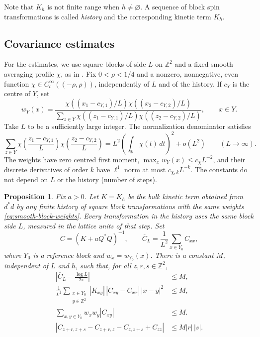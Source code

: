\documentclass[11pt]{article}
\numberwithin{equation}{section}
\newtheorem{proposition}[theorem]{Proposition}
\theoremstyle{definition}
\theoremstyle{plain}
\begin{document}
Note that $K_h$ is not finite range when $h \neq \varnothing$.
A sequence of block spin transformations is called \emph{history}
and the corresponding kinetic term $K_h$.


\subsection{Covariance estimates}
\label{subsec:free-covariance-estimates}

For the estimates, we use square blocks of side $L$ on
$\mathbb Z^2$ and a fixed smooth averaging profile $\chi$, as in
\cite[Sections~3.1 and~4.1]{OpenAI-O3}.
Fix $0<\rho<1/4$ and a nonzero, nonnegative, even function
$\chi\in C_c^\infty((-\rho,\rho))$, independently of $L$ and
of the history.  If $c_Y$ is the centre of $Y$, set
\begin{equation}
 w_Y(x)=
 \frac{\chi((x_1-c_{Y,1})/L)\chi((x_2-c_{Y,2})/L)}
 {\displaystyle\sum_{z\in Y}
   \chi((z_1-c_{Y,1})/L)\chi((z_2-c_{Y,2})/L)},
 \qquad x\in Y.
 \label{eq:smooth-block-weights}
\end{equation}
Take $L$ to be a sufficiently large integer. The normalization denominator satisfies
\begin{equation}
 \sum_{z\in Y}
 \chi\!\left(\frac{z_1-c_{Y,1}}L\right)
 \chi\!\left(\frac{z_2-c_{Y,2}}L\right)
 =L^2\left(\int_{\mathbb R}\chi(t)\,dt\right)^2+o(L^2)
 \qquad (L\to\infty).
 \label{eq:block-weight-normalization}
\end{equation}
The weights have zero centred first moment,
$\max_x w_Y(x)\le c_\chi L^{-2}$, and their discrete derivatives
of order $k$ have $\ell^1$ norm at most $c_{\chi,k}L^{-k}$.
The constants do not depend on $L$ or the history (number of steps).

\begin{proposition}
\label{prop:uniform-covariance-estimates}
Fix $a>0$.
Let $K=K_h$ be the bulk kinetic term obtained from $d^*d$ by
any finite history of square block transformations
with the same weights \eqref{eq:smooth-block-weights}.
Every transformation in the history uses the same block side $L$,
measured in the lattice units of that step.
Set
\begin{equation}
 C=(K+aQ^*Q)^{-1},\qquad
 \overline C_L=\frac1{L^2}\sum_{x\in Y_0}C_{xx},
 \label{eq:free-fluctuation-covariance}
\end{equation}
where $Y_0$ is a reference block and $w_x=w_{Y_0}(x)$.
There is a constant $M$, independent of $L$ and $h$, such that,
for all $z,r,s\in\mathbb Z^2$,
\begin{align}
 \left|\overline C_L-\frac{\log L}{2\pi}\right|&\leq M,\\
 \frac1{L^2}\sum_{\substack{x\in Y_0\\y\in\mathbb Z^2}}
   |K_{xy}|\,|C_{xy}-C_{xx}|\,|x-y|^2&\leq M,\\
 \sum_{x,y\in Y_0}w_xw_y|C_{xy}|&\leq M.
 \label{eq:geom-uniform-bounds}
 \\
 \left|C_{z+r,z+s}-C_{z+r,z}-C_{z,z+s}+C_{zz}\right|
   &\le M|r|\,|s|.
 \label{eq:free-covariance-increments}
\end{align}
\end{proposition}
\end{document}
